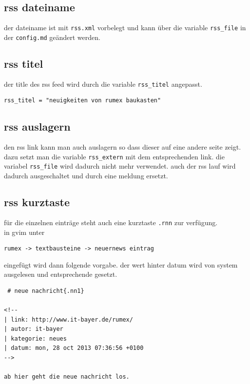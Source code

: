 \subsection{rss dateiname}\label{rss-dateiname}

der dateiname ist mit \texttt{rss.xml} vorbelegt und kann über die
variable \texttt{rss\_file} in der \texttt{config.md} geändert werden.

\subsection{rss titel}\label{rss-titel}

der title des rss feed wird durch die variable \texttt{rss\_titel}
angepasst.

\begin{verbatim}
rss_titel = "neuigkeiten von rumex baukasten"
\end{verbatim}

\subsection{rss auslagern}\label{rss-auslagern}

den rss link kann man auch auslagern so dass dieser auf eine andere
seite zeigt. dazu setzt man die variable \texttt{rss\_extern} mit dem
entsprechenden link. die variabel \texttt{rss\_file} wird dadurch nicht
mehr verwendet. auch der rss lauf wird dadurch ausgeschaltet und durch
eine meldung ersetzt.

\subsection{rss kurztaste}\label{rss-kurztaste}

für die einzelnen einträge steht auch eine kurztaste \texttt{.rnn} zur
verfügung.\\in gvim unter

\begin{verbatim}
rumex -> textbausteine -> neuernews eintrag
\end{verbatim}

eingefügt wird dann folgende vorgabe. der wert hinter datum wird von
system ausgelesen und entsprechende gesetzt.

\begin{verbatim}
 # neue nachricht{.nn1}

<!--
| link: http://www.it-bayer.de/rumex/
| autor: it-bayer
| kategorie: neues
| datum: mon, 28 oct 2013 07:36:56 +0100
-->

ab hier geht die neue nachricht los.
\end{verbatim}

